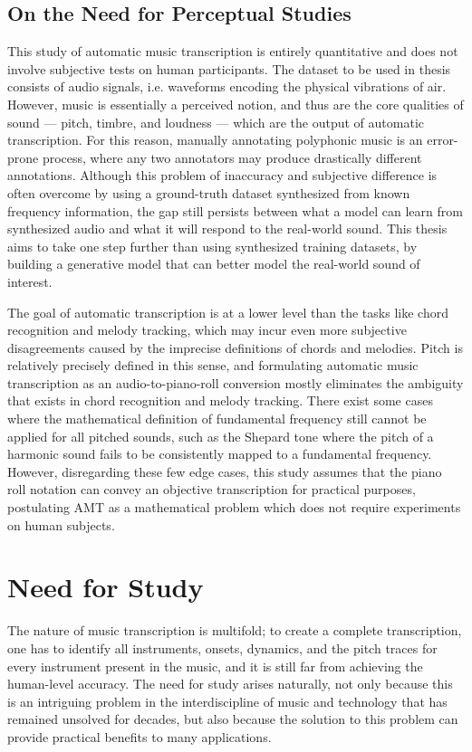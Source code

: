 \subsection{On the Need for Perceptual Studies}

This study of automatic music transcription is entirely quantitative and does not involve subjective tests on human participants.
The dataset to be used in thesis consists of audio signals, i.e. waveforms encoding the physical vibrations of air.
However, music is essentially a perceived notion, and thus are the core qualities of sound --- pitch, timbre, and loudness --- which are the output of automatic transcription.
For this reason, manually annotating polyphonic music is an error-prone process, where any two annotators may produce drastically different annotations.
Although this problem of inaccuracy and subjective difference is often overcome by using a ground-truth dataset synthesized from known frequency information, the gap still persists between what a model can learn from synthesized audio and what it will respond to the real-world sound.
This thesis aims to take one step further than using synthesized training datasets, by building a generative model that can better model the real-world sound of interest.

The goal of automatic transcription is at a lower level than the tasks like chord recognition and melody tracking, which may incur even more subjective disagreements caused by the imprecise definitions of chords and melodies.
Pitch is relatively precisely defined in this sense, and formulating automatic music transcription as an audio-to-piano-roll conversion mostly eliminates the ambiguity that exists in chord recognition and melody tracking.
There exist some cases where the mathematical definition of fundamental frequency still cannot be applied for all pitched sounds, such as the Shepard tone \cite{shepard1964circularity} where the pitch of a harmonic sound fails to be consistently mapped to a fundamental frequency.
However, disregarding these few edge cases, this study assumes that the piano roll notation can convey an objective transcription for practical purposes, postulating AMT as a mathematical problem which does not require experiments on human subjects.

\section{Need for Study}

The nature of music transcription is multifold; to create a complete transcription, one has to identify all instruments, onsets, dynamics, and the pitch traces for every instrument present in the music, and it is still far from achieving the human-level accuracy.
The need for study arises naturally, not only because this is an intriguing problem in the interdiscipline of music and technology that has remained unsolved for decades, but also because the solution to this problem can provide practical benefits to many applications.

